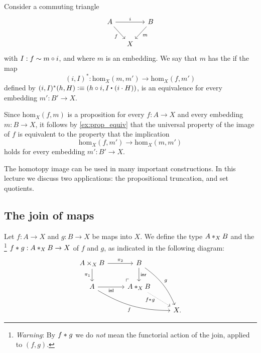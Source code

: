 \begin{defn}
Consider a commuting triangle
\begin{equation*}
\begin{tikzcd}[column sep=small]
A \arrow[rr,"i"] \arrow[dr,swap,"f"] & & B \arrow[dl,"m"] \\
& X
\end{tikzcd}
\end{equation*}
with $I:f\htpy m\circ i$, and where $m$ is an embedding.
We say that $m$ has the  if the map
\begin{equation*}
(i,I)^\ast : \mathrm{hom}_X(m,m')\to\mathrm{hom}_X(f,m')
\end{equation*}
defined by $(i,I)^\ast(h,H)\defeq (h\circ i,\ct{I}{(i\cdot H)})$,
is an equivalence for every embedding $m':B'\to X$. 
\end{defn}

\begin{rmk}
Since $\mathrm{hom}_X(f,m)$ is a proposition for every $f:A\to X$ and every embedding $m:B\to X$, it follows by \cref{ex:prop_equiv} that the universal property of the image of $f$ is equivalent to the property that the implication
\begin{equation*}
\mathrm{hom}_X(f,m')\to\mathrm{hom}_X(m,m')
\end{equation*}
holds for every embedding $m':B'\to X$. 
\end{rmk}

The homotopy image can be used in many important constructions. In this lecture we discuss two applications: the propositional truncation, and set quotients.

\subsection{The join of maps}\label{sec:join-maps}

\begin{defn}
Let $f:A\to X$ and $g:B\to X$ be maps into $X$. We define the type $\join[X]{A}{B}$ and the \footnote{\emph{Warning}: By $\join{f}{g}$ we do \emph{not} mean the functorial action of the
join, applied to $(f,g)$.} $\join{f}{g}:\join[X]{A}{B}\to X$ of
$f$ and $g$, as indicated in the following diagram:
\begin{equation*}
\begin{tikzcd}
A\times_X B \arrow[r,"\pi_2"] \arrow[d,swap,"\pi_1"] \arrow[dr, phantom, "{\ulcorner}", at end] & B \arrow[d,"\inr"] \arrow[ddr,bend left=15,"g"] \\
A \arrow[r,swap,"\inl"] \arrow[drr,bend right=15,swap,"f"] & \join[X]{A}{B} \arrow[dr,densely dotted,swap,near start,"\join{f}{g}" xshift=1ex] \\
& & X.
\end{tikzcd}
\end{equation*}
\end{defn}

